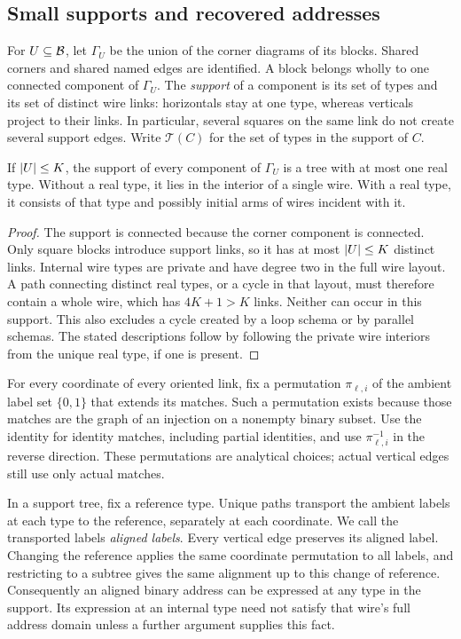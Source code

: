 \subsection{Small supports and recovered addresses}
\label{offset:small-supports}

For \(U\subseteq\mathcal B\), let \(\Gamma_U\) be the union of the corner
diagrams of its blocks. Shared corners and shared named edges are
identified. A block belongs wholly to one connected component of
\(\Gamma_U\). The \emph{support} of a component is its set of types and
its set of distinct wire links: horizontals stay at one type, whereas
verticals project to their links. In particular, several squares on the
same link do not create several support edges.
Write \(\mathcal T(C)\) for the set of types in the support of \(C\).

\begin{lemma}
\label{offset:lem-support}
If \(\lvert U\rvert\le K\), the support of every component of \(\Gamma_U\) is a
tree with at most one real type. Without a real type, it lies in the
interior of a single wire. With a real type, it consists of that type
and possibly initial arms of wires incident with it.
\end{lemma}

\begin{proof}
The support is connected because the corner component is connected.
Only square blocks introduce support links, so it has at most
\(\lvert U\rvert\le K\) distinct links. Internal wire types are private and have
degree two in the full wire layout. A path connecting distinct real
types, or a cycle in that layout, must therefore contain a whole wire,
which has \(4K+1>K\) links. Neither can occur in this support.
This also excludes a cycle created by a loop schema or by parallel
schemas. The stated descriptions follow by following the private wire
interiors from the unique real type, if one is present.
\end{proof}

For every coordinate of every oriented link, fix a permutation
\(\pi_{\ell,i}\) of the ambient label set \(\{0,1\}\) that extends its
matches. Such a permutation exists because those matches are the graph
of an injection on a nonempty binary subset. Use the identity for
identity matches, including partial identities, and use
\(\pi_{\ell,i}^{-1}\) in the reverse direction. These permutations are
analytical choices; actual vertical edges still use only actual matches.

In a support tree, fix a reference type. Unique paths transport the
ambient labels at each type to the reference, separately at each
coordinate. We call the transported labels \emph{aligned labels}.
Every vertical edge preserves its aligned label. Changing the reference
applies the same coordinate permutation to all labels, and restricting
to a subtree gives the same alignment up to this change of reference.
Consequently an aligned binary address can be expressed at any type in
the support. Its expression at an internal type need not satisfy that
wire's full address domain unless a further argument supplies this fact.

